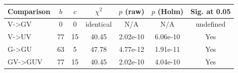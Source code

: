 \begin{tabular}{lcccccc}
\toprule
Comparison & $b$ & $c$ & $\chi^2$ & $p$ (raw) & $p$ (Holm) & Sig. at 0.05 \\
\midrule
V->GV & 0 & 0 & identical & N/A & N/A & undefined \\
V->UV & 77 & 15 & 40.45 & 2.02e-10 & 6.06e-10 & Yes \\
G->GU & 63 & 5 & 47.78 & 4.77e-12 & 1.91e-11 & Yes \\
GV->GUV & 77 & 15 & 40.45 & 2.02e-10 & 4.04e-10 & Yes \\
\bottomrule
\end{tabular}

